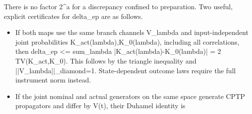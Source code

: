 \documentclass[
]{article}
\begin{document}
There is no factor 2\^{}a for a discrepancy confined to preparation. Two
useful, explicit certificates for delta\_ep are as follows.

\begin{itemize}
\item
  If both maps use the same branch channels V\_lambda and
  input-independent joint probabilities
  K\allowbreak{}\_\allowbreak{}a\allowbreak{}c\allowbreak{}t\allowbreak{}(\allowbreak{}l\allowbreak{}a\allowbreak{}m\allowbreak{}b\allowbreak{}d\allowbreak{}a\allowbreak{})\allowbreak{},\allowbreak{}K\allowbreak{}\_\allowbreak{}0\allowbreak{}(\allowbreak{}l\allowbreak{}a\allowbreak{}m\allowbreak{}b\allowbreak{}d\allowbreak{}a\allowbreak{})\allowbreak{},
  including all correlations, then delta\_ep \textless= sum\_lambda
  |\allowbreak{}K\allowbreak{}\_\allowbreak{}a\allowbreak{}c\allowbreak{}t\allowbreak{}(\allowbreak{}l\allowbreak{}a\allowbreak{}m\allowbreak{}b\allowbreak{}d\allowbreak{}a\allowbreak{})\allowbreak{}-\allowbreak{}K\allowbreak{}\_\allowbreak{}0\allowbreak{}(\allowbreak{}l\allowbreak{}a\allowbreak{}m\allowbreak{}b\allowbreak{}d\allowbreak{}a\allowbreak{})\allowbreak{}|
  = 2 TV(K\_act,K\_0). This follows by the triangle inequality and
  |\allowbreak{}|\allowbreak{}V\allowbreak{}\_\allowbreak{}l\allowbreak{}a\allowbreak{}m\allowbreak{}b\allowbreak{}d\allowbreak{}a\allowbreak{}|\allowbreak{}|\allowbreak{}\_\allowbreak{}d\allowbreak{}i\allowbreak{}a\allowbreak{}m\allowbreak{}o\allowbreak{}n\allowbreak{}d\allowbreak{}=\allowbreak{}1\allowbreak{}.
  State-dependent outcome laws require the full instrument norm instead.
\item
  If the joint nominal and actual generators on the same space generate
  CPTP propagators and differ by V(t), their Duhamel identity is


\end{itemize}
\end{document}
